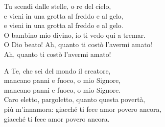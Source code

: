 
\strofa Tu scendi dalle stelle, o re del cielo,\\
e vieni in una grotta al freddo e al gelo,\\
e vieni in una grotta al freddo e al gelo.\\
O bambino mio divino, io ti vedo qui a tremar.\\
O Dio beato! Ah, quanto ti costò l'avermi amato!\\
Ah, quanto ti costò l'avermi amato!

\spazio

\strofa A Te, che sei del mondo il creatore,\\
mancano panni e fuoco, o mio Signore,\\
mancano panni e fuoco, o mio Signore.\\
Caro eletto, pargoletto, quanto questa povertà,\\
più m'innamora: giacché ti fece amor povero ancora,\\
giacché ti fece amor povero ancora.